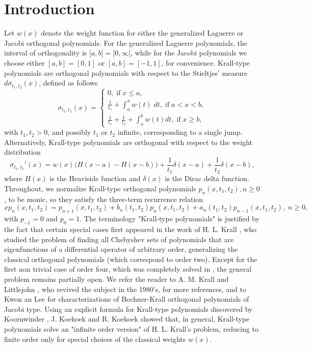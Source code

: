 \documentclass[10pt, reqno]{amsart}
\numberwithin{equation}{section}
\numberwithin{equation}{section}
\begin{document}
\section{Introduction}
Let $w(x)$ denote the weight function for either the generalized Laguerre or Jacobi orthogonal polynomials. For the generalized Laguerre polynomials, the interval of orthogonality is $[a,b[=[0,\infty[$, while for the Jacobi polynomials we choose either $[a,b]=[0,1]$ or $[a,b]=[-1,1]$, for convenience. Krall-type polynomials are orthogonal polynomials with respect to the Stieltjes' measure $d\sigma_{t_1,t_2}(x)$, defined as follows
\begin{equation} \label{kt}
\sigma_{t_1,t_2}(x)=\begin{cases} 0,\;\mbox{if}\; x\leq a,\\\frac{1}{t_1}+\int_a^x w(t)\;dt,\; \mbox{if}\; a<x<b,\\ \frac{1}{t_1}+\frac{1}{t_2}+\int_a^b w(t)dt,\; \mbox{if}\;x\geq b,\end{cases} 
\end{equation}
with $t_1,t_2 >0$, and possibly $t_1$ or $t_2$ infinite, corresponding to a single jump. Alternatively, Krall-type polynomials are orthogonal with respect to the weight distribution
\begin{equation} 
\sigma_{t_1,t_2}'(x)=w(x)\Big(H(x-a)-H(x-b)\Big)+\frac{1}{t_1}\delta(x-a)+\frac{1}{t_2}\delta(x-b),\label{kd}
\end{equation}
where $H(x)$ is the Heaviside function and $\delta(x)$ is the Dirac delta function. Throughout, we normalize Krall-type orthogonal polynomials $p_n(x,t_1,t_2), n\geq 0$, to be monic, so they satisfy the three-term recurrence relation
\begin{equation} \label{re}
xp_n(x,t_1,t_2)=p_{n+1}(x,t_1,t_2)+b_n(t_1,t_2)p_n(x,t_1,t_2)+a_n(t_1,t_2) p_{n-1}(x,t_1,t_2),\; n\geq 0,
\end{equation}
with $p_{-1}=0$ and $p_0=1$. The terminology "Krall-type polynomials" is justified by the fact that certain special cases first appeared in the work of H. L. Krall \cite{K1, K2}, who studied the problem of finding all Chebyshev sets of polynomials that are eigenfunctions of a differential operator of arbitrary order, generalizing the classical orthogonal polynomials (which correspond to order two). Except for the first non trivial case of order four, which was completely solved in \cite{K2}, the general problem remains partially open. We refer the reader to A. M. Krall \cite{KAM1, KAM2} and Littlejohn \cite{LLL1}, who revived the subject in the 1980's, for more references, and to Kwon an Lee \cite{KL} for characterizations of Bochner-Krall orthogonal polynomials of Jacobi type. Using an explicit formula for Krall-type polynomials discovered by Koornwinder \cite{Ko}, J. Koekoek and R. Koekoek \cite{KK1,KK2} showed that, in general, Krall-type polynomials solve an "infinite order version" of H. L. Krall's problem, reducing to finite order only for special choices of the classical weights $w(x)$.
\end{document}
